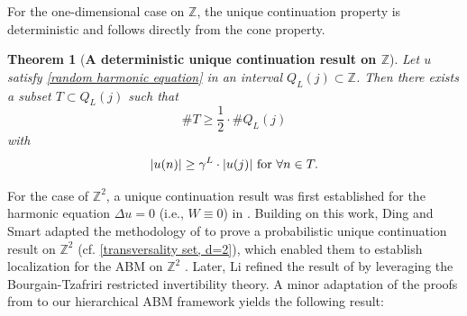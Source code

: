 \documentclass[11pt,reqno,UTF8,twoside]{amsart}
\newcommand{\Z}{\mathbb{Z}}
\newtheorem{thm}{Theorem}[section]
\theoremstyle{definition}
\numberwithin{equation}{section}
\begin{document}
For the one-dimensional case on $\Z$, the unique continuation property is deterministic and follows directly from the cone property.


\begin{thm}[{\bf A deterministic unique continuation result  on  $\Z$}]\label{UC for d=1}
Let $u$ satisfy \eqref{random harmonic equation} in an interval $Q_L(j) \subset \mathbb{Z}$. Then there exists a subset $T \subset Q_L(j)$ such that
\begin{equation}\label{transversality set, d=1}
  \# T\geq \frac{1}{2}\cdot \# Q_L(j) 
\end{equation} 
  with 
  \begin{equation}\label{transversality, d=1}
      |u(n)| \geq \gamma ^L \cdot |u(j)|\ {\rm for}\  \forall n\in T.
  \end{equation}
\end{thm}

For  the  case of $\Z^2$, a unique continuation result   was first established for the harmonic equation $\Delta u = 0$ (i.e., $W \equiv 0$) in \cite{BLMS}. Building on this work, Ding and Smart adapted the methodology of \cite{BLMS} to prove a probabilistic unique continuation result on $\mathbb{Z}^2$ (cf.  \eqref{transversality set, d=2}), which enabled them to establish localization for the ABM on $\Z^2$ \cite{DS20}. Later, Li \cite{Li22} refined the result of \cite{DS20} by leveraging the Bourgain-Tzafriri restricted invertibility theory. A minor adaptation of the proofs from \cite{Li22, DS20} to our hierarchical ABM framework yields the following result:
\end{document}
